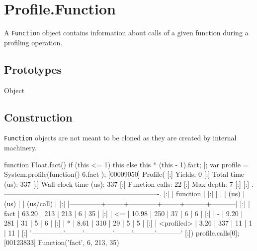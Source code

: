 
\section{Profile.Function}

A \lstinline|Function| object contains information about calls of a
given function during a profiling operation.

\subsection{Prototypes}

\begin{refObjects}
\item[Object]
\end{refObjects}

\subsection{Construction}

\lstinline|Function| objects are not meant to be cloned as they are
created by  internal machinery.

\begin{urbiscript}
function Float.fact()
{
  if (this <= 1)
    this
  else
    this * (this - 1).fact;
}|;
var profile = System.profile(function() { 6.fact });
[00009050] Profile(
[:]  Yields:                    0
[:]  Total time (us):         337
[:]  Wall-clock time (us):    337
[:]  Function calls:           22
[:]  Max depth:                 7
[:]
[:]  .-------------------------------------------------------------------.
[:]  |   function   |   %
[:]  |              |        |    (us)    |  (us)  |         | (us/call) |
[:]  |--------------+--------+------------+--------+---------+-----------|
[:]  |         fact |  63.20 |        213 |    213 |       6 |        35 |
[:]  |           <= |  10.98 |        250 |     37 |       6 |         6 |
[:]  |            - |   9.20 |        281 |     31 |       5 |         6 |
[:]  |            * |   8.61 |        310 |     29 |       5 |         5 |
[:]  |   <profiled> |   3.26 |        337 |     11 |       1 |        11 |
[:]  '--------------'--------'------------'--------'---------'-----------'
[:])
profile.calls[0];
[00123833] Function('fact', 6, 213, 35)
\end{urbiscript}


